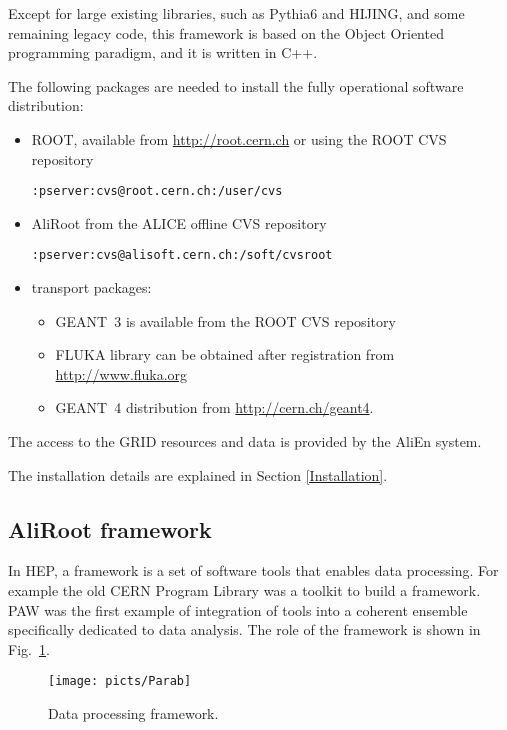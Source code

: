 \documentclass[12pt,a4paper,twoside]{article}
\begin{document}
Except for large existing libraries, such as Pythia6\cite{MC:PYTH} and
HIJING\cite{MC:HIJING}, and some remaining legacy code, this framework
is  based on  the  Object  Oriented programming  paradigm,  and it  is
written in C++.

The following packages are needed to install the fully operational
software distribution: 
\begin{itemize}
\item ROOT, available from \url{http://root.cern.ch}
or using the ROOT CVS repository
\begin{verbatim}
:pserver:cvs@root.cern.ch:/user/cvs
\end{verbatim}
\item AliRoot from the ALICE offline CVS repository 
\begin{verbatim}
:pserver:cvs@alisoft.cern.ch:/soft/cvsroot
\end{verbatim}
\item transport packages:
\begin{itemize}
\item GEANT~3 is available from the ROOT CVS repository
\item  FLUKA library can
be obtained after registration from \url{http://www.fluka.org}
\item GEANT~4 distribution from \url{http://cern.ch/geant4}.
\end{itemize}
\end{itemize}

The access to the GRID resources and data is provided by the
AliEn\cite{AliEn} system.

The installation details are explained in Section \ref{Installation}.

\subsection{AliRoot framework}\label{AliRootFramework}

In HEP, a framework is a set of software tools that enables data
processing. For example the old CERN Program Library was a toolkit to
build a framework. PAW was the first example of integration of tools
into a coherent ensemble specifically dedicated to data analysis. The
role of the framework is shown in Fig.~\ref{MC:Parab}.

\begin{figure}[ht]
  \centering
  \texttt{[image: picts/Parab]}
  \caption{Data processing framework.} \label{MC:Parab}
\end{figure}
\end{document}
